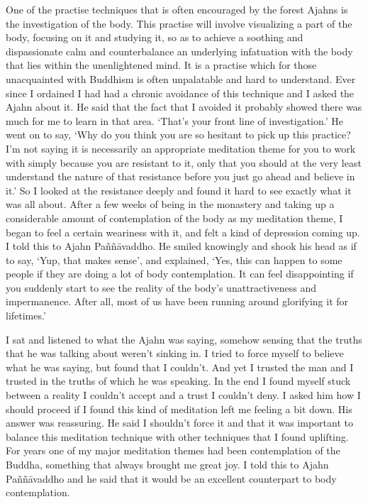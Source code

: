 One of the practise techniques that is often encouraged by the forest
Ajahns is the investigation of the body. This practise will involve
visualizing a part of the body, focusing on it and studying it, so as to
achieve a soothing and dispassionate calm and counterbalance an
underlying infatuation with the body that lies within the unenlightened
mind. It is a practise which for those unacquainted with Buddhism is
often unpalatable and hard to understand. Ever since I ordained I had
had a chronic avoidance of this technique and I asked the Ajahn about
it. He said that the fact that I avoided it probably showed there was
much for me to learn in that area. `That's your front line of
investigation.' He went on to say, `Why do you think you are so hesitant
to pick up this practice? I'm not saying it is necessarily an
appropriate meditation theme for you to work with simply because you are
resistant to it, only that you should at the very least understand the
nature of that resistance before you just go ahead and believe in it.'
So I looked at the resistance deeply and found it hard to see exactly
what it was all about. After a few weeks of being in the monastery and
taking up a considerable amount of contemplation of the body as my
meditation theme, I began to feel a certain weariness with it, and felt
a kind of depression coming up. I told this to Ajahn Paññāvaddho. He
smiled knowingly and shook his head as if to say, `Yup, that makes
sense', and explained, `Yes, this can happen to some people if they are
doing a lot of body contemplation. It can feel disappointing if you
suddenly start to see the reality of the body's unattractiveness and
impermanence. After all, most of us have been running around glorifying
it for lifetimes.'

I sat and listened to what the Ajahn was saying, somehow sensing that
the truths that he was talking about weren't sinking in. I tried to
force myself to believe what he was saying, but found that I couldn't. 
And yet I trusted the man and I trusted in the truths of which he was
speaking. In the end I found myself stuck between a reality I couldn't
accept and a trust I couldn't deny. I asked him how I should proceed if
I found this kind of meditation left me feeling a bit down. His answer
was reassuring. He said I shouldn't force it and that it was important
to balance this meditation technique with other techniques that I found
uplifting. For years one of my major meditation themes had been
contemplation of the Buddha, something that always brought me great joy. 
I told this to Ajahn Paññāvaddho and he said that it would be an
excellent counterpart to body contemplation. 

